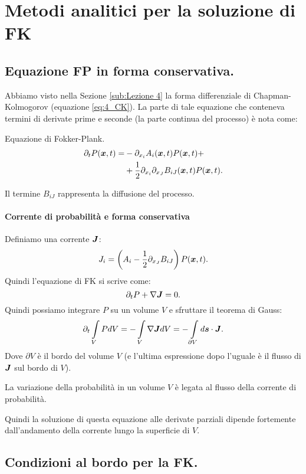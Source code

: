 \section{Metodi analitici per la soluzione di FK}%
\label{sub:Lezione 11-1}
\mylocaltoc
\subsection{Equazione FP in forma conservativa.}%
\label{sub:Equazione di Fokker-Plank: soluzione analitica.}
Abbiamo visto nella Sezione \ref{sub:Lezione 4} la forma differenziale di Chapman-Kolmogorov (equazione \ref{eq:4_CK}). La parte di tale equazione che conteneva termini di derivate prime e seconde (la parte continua del processo) è nota come:
\begin{redbox}{Equazione di Fokker-Plank.}
   \begin{align}
       \partial_{t}P(\boldsymbol{x}, t) = &
      				      -\partial_{x_i}A_i(\boldsymbol{x}, t) P(\boldsymbol{x}, t) + \nonumber \\
				    & + \frac{1}{2}\partial_{x_i}\partial_{x_J}B_{iJ}(\boldsymbol{x},t) P(\boldsymbol{x},t) 
				    \label{eq:FK_general}
   .\end{align}
\end{redbox}
\noindent
Il termine $B_{iJ}$ rappresenta la diffusione del processo.
\paragraph{Corrente di probabilità e forma conservativa}
Definiamo una corrente $\boldsymbol{J}$:
\[
    J_i = \left(A_i - \frac{1}{2}\partial_{x_J}B_{iJ}\right)P(\boldsymbol{x},t) 
.\] 
Quindi l'equazione di FK si scrive come:
\[
    \partial_{t}P + \nabla \boldsymbol{J} = 0
.\] 
Quindi possiamo integrare $P$ su un volume $V$ e sfruttare il teorema di Gauss:
\[\begin{aligned}
    \partial_{t}\int\limits_{V} PdV = - \int\limits_{V}  \nabla \boldsymbol{J} dV = - \int\limits_{\partial V} d\boldsymbol{s}\cdot \boldsymbol{J}
.\end{aligned}\]
Dove $\partial V$ è il bordo del volume $V$ (e l'ultima espressione dopo l'uguale è il flusso di $\boldsymbol{J}$ sul bordo di $V$). 
\begin{greenbox}{}
    La variazione della probabilità in un volume $V$ è legata al flusso della corrente di probabilità.
\end{greenbox}
\noindent
Quindi la soluzione di questa equazione alle derivate parziali dipende fortemente dall'andamento della corrente lungo la superficie di $V$.
\subsection{Condizioni al bordo per la FK.}%
\label{sub:Condizioni al bordo per la soluzione della FK.}
